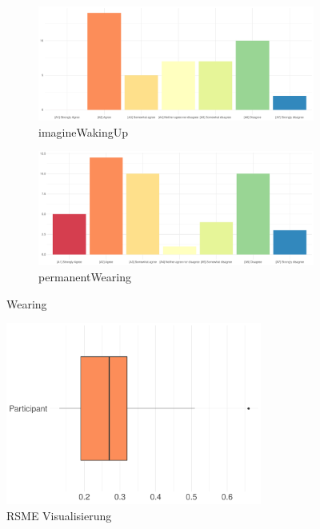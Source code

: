 \begin{figure}
	\centering
	\begin{subfigure}{0.48\textwidth}
		\includegraphics[width=\textwidth]{./_StudyResults/imagineWakingUp}
		\caption{imagineWakingUp}
		\label{fig:imagineWakingUp}
	\end{subfigure}%
	\hfill
	\begin{subfigure}{0.48\textwidth}
		\includegraphics[width=\textwidth]{./_StudyResults/permanentWearing}
		\caption{permanentWearing}
		\label{fig:permanentWearing}
	\end{subfigure}
	\caption{Wearing} %
\end{figure}

\begin{figure}
	\centering
	\includegraphics[width=0.75\textwidth]{./_StudyResults/rsme}
	\caption{RSME Visualisierung}
	\label{fig:rsme_vis}
\end{figure}
